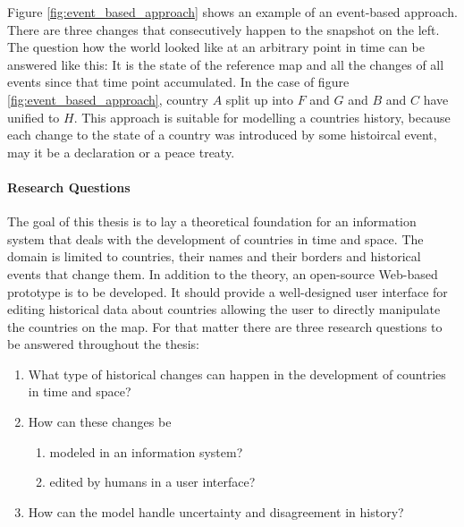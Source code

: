 Figure \ref{fig:event_based_approach} shows an example of an event-based approach. There are three changes that consecutively happen to the snapshot on the left. The question how the world looked like at an arbitrary point in time can be answered like this: It is the state of the reference map and all the changes of all events since that time point accumulated. In the case of figure \ref{fig:event_based_approach}, country $A$ split up into $F$ and $G$ and $B$ and $C$ have unified to $H$. This approach is suitable for modelling a countries history, because each change to the state of a country was introduced by some histoircal event, may it be a declaration or a peace treaty.

\paragraph{Research Questions} %
\label{par:research_questions}

The goal of this thesis is to lay a theoretical foundation for an information system that deals with the development of countries in time and space. The domain is limited to countries, their names and their borders and historical events that change them. In addition to the theory, an open-source Web-based prototype is to be developed. It should provide a well-designed user interface for editing historical data about countries allowing the user to directly manipulate the countries on the map. For that matter there are three research questions to be answered throughout the thesis:

\begin{enumerate}
  \item What type of historical changes can happen in the development of countries in time and space?
  \item How can these changes be
  \begin{enumerate}
    \item modeled in an information system?
    \item edited by humans in a user interface?
  \end{enumerate}
  \item How can the model handle uncertainty and disagreement in history?
\end{enumerate}


\newpage
